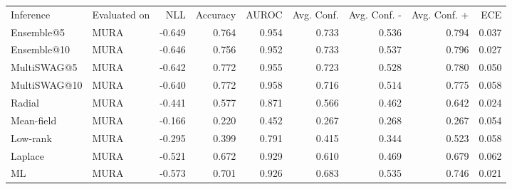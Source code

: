 \begin{tabular}{llrrrrrrr}
Inference & Evaluated on & NLL & Accuracy & AUROC & Avg. Conf. & Avg. Conf. - & Avg. Conf. + & ECE \\
Ensemble@5 & MURA & -0.649 & 0.764 & 0.954 & 0.733 & 0.536 & 0.794 & 0.037 \\
Ensemble@10 & MURA & -0.646 & 0.756 & 0.952 & 0.733 & 0.537 & 0.796 & 0.027 \\
MultiSWAG@5 & MURA & -0.642 & 0.772 & 0.955 & 0.723 & 0.528 & 0.780 & 0.050 \\
MultiSWAG@10 & MURA & -0.640 & 0.772 & 0.958 & 0.716 & 0.514 & 0.775 & 0.058 \\
Radial & MURA & -0.441 & 0.577 & 0.871 & 0.566 & 0.462 & 0.642 & 0.024 \\
Mean-field & MURA & -0.166 & 0.220 & 0.452 & 0.267 & 0.268 & 0.267 & 0.054 \\
Low-rank & MURA & -0.295 & 0.399 & 0.791 & 0.415 & 0.344 & 0.523 & 0.058 \\
Laplace & MURA & -0.521 & 0.672 & 0.929 & 0.610 & 0.469 & 0.679 & 0.062 \\
ML & MURA & -0.573 & 0.701 & 0.926 & 0.683 & 0.535 & 0.746 & 0.021 \\
\end{tabular}
